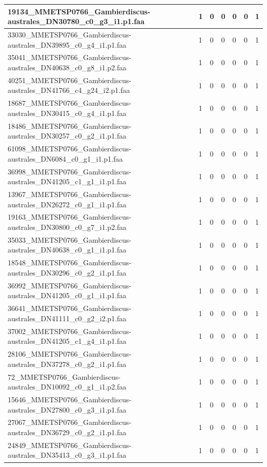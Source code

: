 \documentclass[12pt]{article}
\begin{document}
\begin{longtable}{ | p{2cm} | p{2cm} |p{2.5cm} | p{2cm} | p{2.5cm} |  p{2cm} | p{2cm} |}
 \hline 
19134\_MMETSP0766\_Gambierdiscus-australes\_DN30780\_c0\_g3\_i1.p1.faa&1&0&0&0&0&1\\ 
 \hline 
33030\_MMETSP0766\_Gambierdiscus-australes\_DN39895\_c0\_g4\_i1.p1.faa&1&0&0&0&0&1\\ 
 \hline 
35041\_MMETSP0766\_Gambierdiscus-australes\_DN40638\_c0\_g8\_i1.p2.faa&1&0&0&0&0&1\\ 
 \hline 
40251\_MMETSP0766\_Gambierdiscus-australes\_DN41766\_c4\_g24\_i2.p1.faa&1&0&0&0&0&1\\ 
 \hline 
18687\_MMETSP0766\_Gambierdiscus-australes\_DN30415\_c0\_g4\_i1.p1.faa&1&0&0&0&0&1\\ 
 \hline 
18486\_MMETSP0766\_Gambierdiscus-australes\_DN30257\_c0\_g2\_i1.p1.faa&1&0&0&0&0&1\\ 
 \hline 
61098\_MMETSP0766\_Gambierdiscus-australes\_DN6084\_c0\_g1\_i1.p1.faa&1&0&0&0&0&1\\ 
 \hline 
36998\_MMETSP0766\_Gambierdiscus-australes\_DN41205\_c1\_g1\_i1.p1.faa&1&0&0&0&0&1\\ 
 \hline 
13967\_MMETSP0766\_Gambierdiscus-australes\_DN26272\_c0\_g1\_i1.p1.faa&1&0&0&0&0&1\\ 
 \hline 
19163\_MMETSP0766\_Gambierdiscus-australes\_DN30800\_c0\_g7\_i1.p2.faa&1&0&0&0&0&1\\ 
 \hline 
35033\_MMETSP0766\_Gambierdiscus-australes\_DN40638\_c0\_g1\_i1.p1.faa&1&0&0&0&0&1\\ 
 \hline 
18548\_MMETSP0766\_Gambierdiscus-australes\_DN30296\_c0\_g2\_i1.p1.faa&1&0&0&0&0&1\\ 
 \hline 
36992\_MMETSP0766\_Gambierdiscus-australes\_DN41205\_c0\_g1\_i1.p1.faa&1&0&0&0&0&1\\ 
 \hline 
36641\_MMETSP0766\_Gambierdiscus-australes\_DN41111\_c0\_g2\_i2.p1.faa&1&0&0&0&0&1\\ 
 \hline 
37002\_MMETSP0766\_Gambierdiscus-australes\_DN41205\_c1\_g4\_i1.p1.faa&1&0&0&0&0&1\\ 
 \hline 
28106\_MMETSP0766\_Gambierdiscus-australes\_DN37278\_c0\_g2\_i1.p1.faa&1&0&0&0&0&1\\ 
 \hline 
72\_MMETSP0766\_Gambierdiscus-australes\_DN10092\_c0\_g1\_i1.p2.faa&1&0&0&0&0&1\\ 
 \hline 
15646\_MMETSP0766\_Gambierdiscus-australes\_DN27800\_c0\_g3\_i1.p1.faa&1&0&0&0&0&1\\ 
 \hline 
27067\_MMETSP0766\_Gambierdiscus-australes\_DN36729\_c0\_g2\_i1.p1.faa&1&0&0&0&0&1\\ 
 \hline 
24849\_MMETSP0766\_Gambierdiscus-australes\_DN35413\_c0\_g3\_i1.p1.faa&1&0&0&0&0&1\\ 

\end{longtable}
\end{document}
